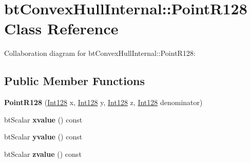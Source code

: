 \hypertarget{classbt_convex_hull_internal_1_1_point_r128}{\section{bt\+Convex\+Hull\+Internal\+:\+:Point\+R128 Class Reference}
\label{classbt_convex_hull_internal_1_1_point_r128}
}


Collaboration diagram for bt\+Convex\+Hull\+Internal\+:\+:Point\+R128\+:
\subsection*{Public Member Functions}
\begin{DoxyCompactItemize}
\item 
\hypertarget{classbt_convex_hull_internal_1_1_point_r128_a254a97a2fd7f9a30fb065188d4d6c78a}{{\bfseries Point\+R128} (\hyperlink{classbt_convex_hull_internal_1_1_int128}{Int128} x, \hyperlink{classbt_convex_hull_internal_1_1_int128}{Int128} y, \hyperlink{classbt_convex_hull_internal_1_1_int128}{Int128} z, \hyperlink{classbt_convex_hull_internal_1_1_int128}{Int128} denominator)}\label{classbt_convex_hull_internal_1_1_point_r128_a254a97a2fd7f9a30fb065188d4d6c78a}

\item 
\hypertarget{classbt_convex_hull_internal_1_1_point_r128_a54069ea61b7e0747b18af2e2b2124188}{bt\+Scalar {\bfseries xvalue} () const }\label{classbt_convex_hull_internal_1_1_point_r128_a54069ea61b7e0747b18af2e2b2124188}

\item 
\hypertarget{classbt_convex_hull_internal_1_1_point_r128_aa8e0178d8761039ca9ab3f80322b839a}{bt\+Scalar {\bfseries yvalue} () const }\label{classbt_convex_hull_internal_1_1_point_r128_aa8e0178d8761039ca9ab3f80322b839a}

\item 
\hypertarget{classbt_convex_hull_internal_1_1_point_r128_a4cacafabaef988ed5bad54993b88b266}{bt\+Scalar {\bfseries zvalue} () const }\label{classbt_convex_hull_internal_1_1_point_r128_a4cacafabaef988ed5bad54993b88b266}

\end{DoxyCompactItemize}
